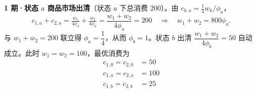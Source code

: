 \begin{solution}
        \textbf{1 期·状态 $a$ 商品市场出清}（状态 $a$ 下总消费 $200$）。由 $c_{k,a}=\tfrac14 w_{k}/\phi_{a}$，
        \[
            c_{1,a}+c_{2,a}=\tfrac{w_{1}}{4\phi_{a}}+\tfrac{w_{2}}{4\phi_{a}}
            =\frac{w_{1}+w_{2}}{4\phi_{a}}=200
            \quad\Longrightarrow\quad w_{1}+w_{2}=800\phi_{a}.
        \]
        与 $w_{1}+w_{2}=200$ 联立得 $\phi_{a}=\dfrac14$，从而 $\phi_{b}=1$。状态 $b$ 出清 $\dfrac{w_{1}+w_{2}}{4\phi_{b}}=50$ 自动成立。此时 $w_{1}=w_{2}=100$，最优消费为
        \[
            \begin{aligned}
                c_{1,0}=c_{2,0}&=50\\
                c_{1,a}=c_{2,a}&=100\\
                c_{1,b}=c_{2,b}&=25
            \end{aligned}
        \]
        \end{solution}

